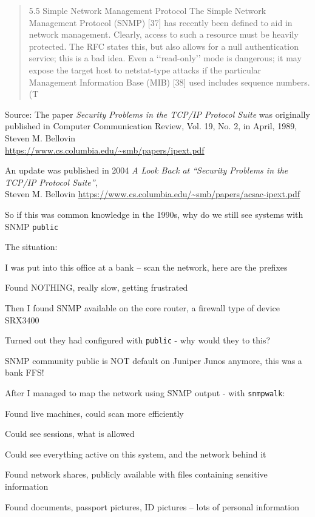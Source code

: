 \documentclass[Screen16to9,17pt]{foils}
\begin{document}
\begin{quote}
5.5 Simple Network Management Protocol
The Simple Network Management Protocol (SNMP) [37] has recently been defined to aid in network
management. Clearly, access to such a resource must be heavily protected. The RFC states this, but
also allows for a null authentication service; this is a bad idea. Even a ‘‘read-only’’ mode is dangerous;
it may expose the target host to netstat-type attacks if the particular Management Information Base
(MIB) [38] used includes sequence numbers. (T
\end{quote}
Source: The paper \emph{Security Problems in the TCP/IP Protocol Suite} was originally\\
published in Computer Communication Review, Vol. 19, No. 2, in April, 1989, Steven M. Bellovin\\
\url{https://www.cs.columbia.edu/~smb/papers/ipext.pdf}

An update was published in 2004
\emph{A Look Back at “Security Problems in the TCP/IP Protocol Suite”}, \\
Steven M. Bellovin
\url{https://www.cs.columbia.edu/~smb/papers/acsac-ipext.pdf}

So if this was common knowledge in the 1990s, why do we still see systems with SNMP \verb+public+

The situation:
\begin{list2}
\item I was put into this office at a bank -- scan the network, here are the prefixes
\item Found NOTHING, really slow, getting frustrated
\item Then I found SNMP available on the core router, a firewall type of device SRX3400
\item Turned out they had configured with \verb+public+ - why would they to this?
\item SNMP community public is NOT default on Juniper Junos anymore, this was a bank FFS!
\end{list2}


After I managed to map the network using SNMP output - with \verb+snmpwalk+:
\begin{list2}
\item Found live machines, could scan more efficiently
\item Could see sessions, what is allowed
\item Could see everything active on this system, and the network behind it
\item Found network shares, publicly available with files containing sensitive information
\item Found documents, passport pictures, ID pictures -- lots of personal information
\end{list2}
\end{document}

